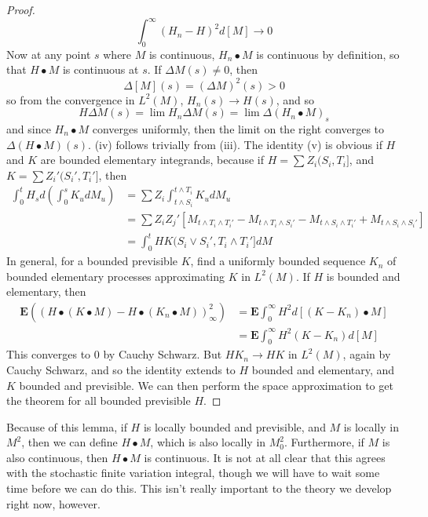 \begin{proof}
    \[ \int_0^\infty (H_n - H)^2 d[M] \to 0 \]
    Now at any point $s$ where $M$ is continuous, $H_n \bullet M$ is continuous by definition, so that $H \bullet M$ is continuous at $s$. If $\Delta M(s) \neq 0$, then
    \[ \Delta [M](s) = (\Delta M)^2(s) > 0 \]
    so from the convergence in $L^2(M)$, $H_n(s) \to H(s)$, and so
    \[ H \Delta M(s) = \lim H_n \Delta M(s) = \lim \Delta (H_n \bullet M)_s \]
    and since $H_n \bullet M$ converges uniformly, then the limit on the right converges to $\Delta (H \bullet M)(s)$. (iv) follows trivially from (iii). The identity (v) is obvious if $H$ and $K$ are bounded elementary integrands, because if $H = \sum Z_i (S_i,T_i]$, and $K = \sum Z_i' (S_i',T_i']$, then
    \begin{align*}
        \int_0^t H_s d \left( \int_0^s K_u dM_u \right) &= \sum Z_i \int_{t \wedge S_i}^{t \wedge T_i} K_u dM_u\\
        &= \sum Z_iZ_j'[M_{t \wedge T_i \wedge T_i'} - M_{t \wedge T_i \wedge S_i'} - M_{t \wedge S_i \wedge T_i'} + M_{t \wedge S_i \wedge S_i'}]\\
        &= \int_0^t HK(S_i \vee S_i', T_i \wedge T_i'] dM
    \end{align*}
    In general, for a bounded previsible $K$, find a uniformly bounded sequence $K_n$ of bounded elementary processes approximating $K$ in $L^2(M)$. If $H$ is bounded and elementary, then
    \begin{align*}
        \mathbf{E} \left( \left( H \bullet (K \bullet M) - H \bullet (K_n \bullet M) \right)^2_\infty \right) &= \mathbf{E} \int_0^\infty H^2 d[(K - K_n) \bullet M]\\
        &= \mathbf{E} \int_0^\infty H^2 (K - K_n) d[M]
    \end{align*}
    This converges to 0 by Cauchy Schwarz. But $HK_n \to HK$ in $L^2(M)$, again by Cauchy Schwarz, and so the identity extends to $H$ bounded and elementary, and $K$ bounded and previsible. We can then perform the space approximation to get the theorem for all bounded previsible $H$.
\end{proof}

Because of this lemma, if $H$ is locally bounded and previsible, and $M$ is locally in $M^2$, then we can define $H \bullet M$, which is also locally in $M^2_0$. Furthermore, if $M$ is also continuous, then $H \bullet M$ is continuous. It is not at all clear that this agrees with the stochastic finite variation integral, though we will have to wait some time before we can do this. This isn't really important to the theory we develop right now, however.

